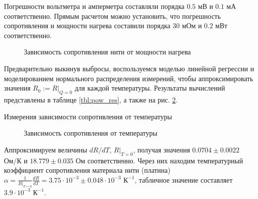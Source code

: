 \documentclass[a4paper,12pt]{article}
\begin{document}
  Погрешности вольтметра и амперметра составляли порядка $0.5$ мВ и $0.1$ мА соответственно. Прямым расчетом можно установить, что погрешность сопротивления и мощности нагрева составили порядка $30$ мОм и $0.2$ мВт соответственно.


  \begin{figure}[!htb]
    \begin{minipage}{0.5\textwidth}
      \centering
      
      \vspace*{5mm}
      
    \end{minipage}
    \begin{minipage}{0.5\textwidth}
      \centering
      
      \vspace*{5mm}
      
    \end{minipage}

  \end{figure}

  \begin{figure}[!htb]
    \centering
    
    \caption{Зависимость сопротивления нити от мощности нагрева}
    \label{fig:pow_res}
  \end{figure}

  Предварительно выкинув выбросы, воспользуемся моделью линейной регрессии и моделированием нормального распределения измерений, чтобы аппроксимировать значения $R_0 := R|_{Q = 0}$ для каждой температуры. Результаты вычислений представлены в таблице \ref{tbl:pow_res}, а также на рис. \ref{fig:temp_res}.

  \begin{table}[!htb]
    \centering
    
    \caption{Измерения зависимости сопротивления от температуры}
    \label{tbl:pow_res}
  \end{table}

  \begin{figure}[!htb]
    \centering
    
    \caption{Зависимость сопротивления от температуры}
    \label{fig:temp_res}
  \end{figure}

  Аппроксимируем величины $dR/dT$, $R|_{T = 0}$, получая значения $0.0704 \pm 0.0022$ Ом/К и $18.779 \pm 0.035$ Ом соответственно. Через них находим температурный коэффициент сопротивления материала нити (платина) $ \alpha = \frac{1}{R|_{T = 0}} \frac{dR}{dT} = 3.75 \cdot 10^{-3} \pm 0.048 \cdot 10^{-3}$ $К^{-1}$, табличное значение составляет $ 3.9 \cdot 10^{-3} $ $К^{-1}$.
\end{document}
